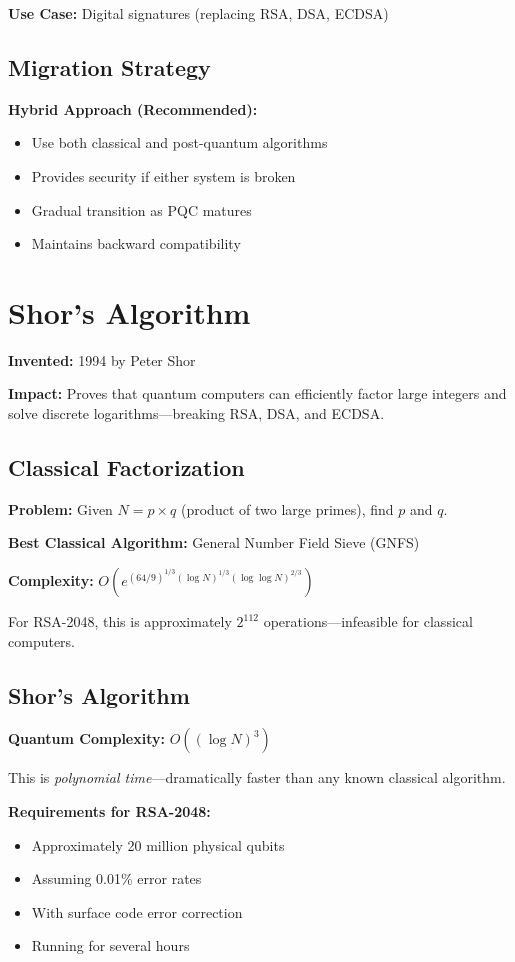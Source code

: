 \documentclass[12pt,oneside]{book}
\begin{document}
\textbf{Use Case:} Digital signatures (replacing RSA, DSA, ECDSA)

\subsection{Migration Strategy}

\textbf{Hybrid Approach (Recommended):}
\begin{itemize}
\item Use both classical and post-quantum algorithms
\item Provides security if either system is broken
\item Gradual transition as PQC matures
\item Maintains backward compatibility
\end{itemize}

\section{Shor's Algorithm}

\textbf{Invented:} 1994 by Peter Shor

\textbf{Impact:} Proves that quantum computers can efficiently factor large integers and solve discrete logarithms---breaking RSA, DSA, and ECDSA.

\subsection{Classical Factorization}

\textbf{Problem:} Given $N = p \times q$ (product of two large primes), find $p$ and $q$.

\textbf{Best Classical Algorithm:} General Number Field Sieve (GNFS)

\textbf{Complexity:} $O(e^{(64/9)^{1/3} (\log N)^{1/3} (\log \log N)^{2/3}})$

For RSA-2048, this is approximately $2^{112}$ operations---infeasible for classical computers.

\subsection{Shor's Algorithm}

\textbf{Quantum Complexity:} $O((\log N)^3)$

This is \textit{polynomial time}---dramatically faster than any known classical algorithm.

\textbf{Requirements for RSA-2048:}
\begin{itemize}
\item Approximately 20 million physical qubits
\item Assuming 0.01\% error rates
\item With surface code error correction
\item Running for several hours
\end{itemize}
\end{document}
